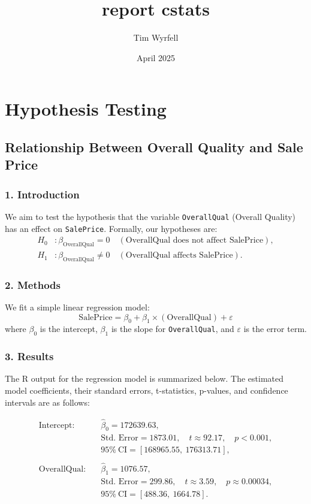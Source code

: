 \documentclass{article}
\title{report cstats}
\author{Tim Wyrfell}
\date{April 2025}
\begin{document}
\maketitle

\section*{Hypothesis Testing}

\subsection*{Relationship Between Overall Quality and Sale Price}

\subsubsection*{1. Introduction}
We aim to test the hypothesis that the variable \texttt{OverallQual} (Overall Quality) has an effect on \texttt{SalePrice}. Formally, our hypotheses are:
\[
\begin{aligned}
H_0 &: \beta_{\text{OverallQual}} = 0 \quad (\text{OverallQual does not affect SalePrice}),\\
H_1 &: \beta_{\text{OverallQual}} \neq 0 \quad (\text{OverallQual affects SalePrice}).
\end{aligned}
\]

\subsubsection*{2. Methods}
We fit a simple linear regression model:
\[
\text{SalePrice} = \beta_0 + \beta_1 \times (\text{OverallQual}) + \varepsilon
\]
where \(\beta_0\) is the intercept, \(\beta_1\) is the slope for \texttt{OverallQual}, and \(\varepsilon\) is the error term.

\subsubsection*{3. Results}

The R output for the regression model is summarized below. The estimated model coefficients, their standard errors, t-statistics, p-values, and confidence intervals are as follows:

\[
\begin{aligned}
\text{Intercept}:\quad & \hat{\beta}_0 = 172639.63, \\
& \text{Std. Error} = 1873.01,\quad t \approx 92.17,\quad p < 0.001, \\
& 95\%\ \text{CI} = [168965.55,\ 176313.71],\\
\\
\text{OverallQual}:\quad & \hat{\beta}_1 = 1076.57, \\
& \text{Std. Error} = 299.86,\quad t \approx 3.59,\quad p \approx 0.00034, \\
& 95\%\ \text{CI} = [488.36,\ 1664.78].\\
\end{aligned}
\]
\end{document}
